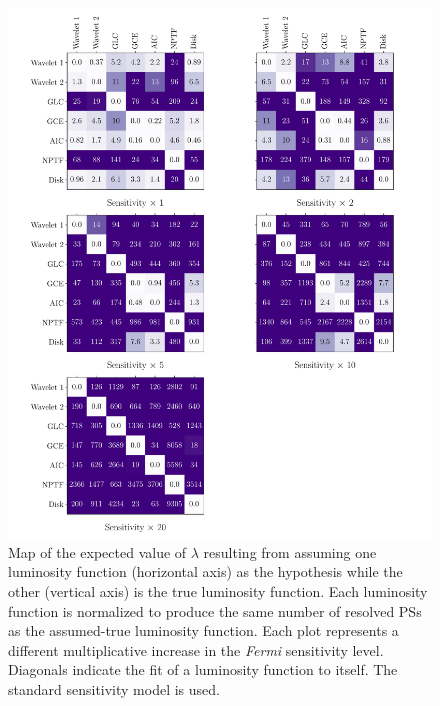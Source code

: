 \documentclass[letter,11pt]{article}
\begin{document}
\begin{figure}
    \centering
    \includegraphics[width=\textwidth]{figs/hist-unbinned-sensitivity.pdf}
    \caption{Map of the expected value of $\lambda$ resulting from assuming one luminosity function (horizontal axis) as the hypothesis while the other (vertical axis) is the true luminosity function. Each luminosity function is normalized to produce the same number of resolved PSs as the assumed-true luminosity function. Each plot represents a different multiplicative increase in the \textit{Fermi} sensitivity level. Diagonals indicate the fit of a luminosity function to itself. The standard sensitivity model is used.}
    \label{fig:hist-fitting-sensitivity}
\end{figure}
\end{document}
